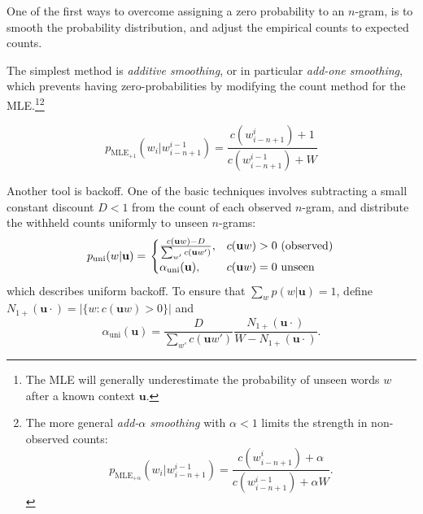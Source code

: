One of the first ways to overcome assigning a zero probability to an $n$-gram, is to smooth the probability distribution, and adjust the empirical counts to expected counts.

The simplest method is \emph{additive smoothing}, or in particular \emph{add-one smoothing}, which prevents having zero-probabilities by modifying the count method for the MLE.\footnote{The MLE will generally underestimate the probability of unseen words $w$ after a known context $\mathbf{u}$.}\footnote{The more general \emph{add-$\alpha$ smoothing} with $\alpha < 1$ limits the strength in non-observed counts: \[ p_{\operatorname{MLE_{+\alpha}}}\left(w_i|w_{i-n+1}^{i-1}\right) = \frac{c\left(w_{i-n+1}^i\right)+\alpha}{c\left(w_{i-n+1}^{i-1}\right)+\alpha W}.\]}



\begin{equation} p_{\operatorname{MLE_{+1}}}\left(w_i|w_{i-n+1}^{i-1}\right) = \frac{c\left(w_{i-n+1}^i\right)+1}{c\left(w_{i-n+1}^{i-1}\right)+W}\label{eq:paddone}
\end{equation}


Another tool is backoff. One of the basic techniques involves subtracting a small constant discount $D < 1$ from the count of each observed $n$-gram, and distribute the withheld counts uniformly to unseen $n$-grams:
\begin{equation}
	p_{\operatorname{uni}}(w|\mathbf{u})=\left.
    \begin{cases}
    	\frac{c(\mathbf{u}w)-D}{\sum_{w'}c(\mathbf{u}w')}, & c(\mathbf{u}w) > 0\textnormal{ (observed)} \\
        \alpha_{\operatorname{uni}}(\mathbf{u}), & c(\mathbf{u}w) = 0\textnormal{ unseen}
    \end{cases}\right.
\end{equation}
which describes uniform backoff. To ensure that $\sum_wp(w|\mathbf{u})=1$, \autocite{chen1996empirical} define $N_{1+}(\mathbf{u}\cdot) = |\{w:c(\mathbf{u}w) > 0\}|$ and
\begin{equation}
\alpha_{\operatorname{uni}}(\mathbf{u}) = \frac{D}{\sum_{w'}c(\mathbf{u}w')}\frac{N_{1+}(\mathbf{u}\cdot)}{W - N_{1+}(\mathbf{u}\cdot)}.
\end{equation}

